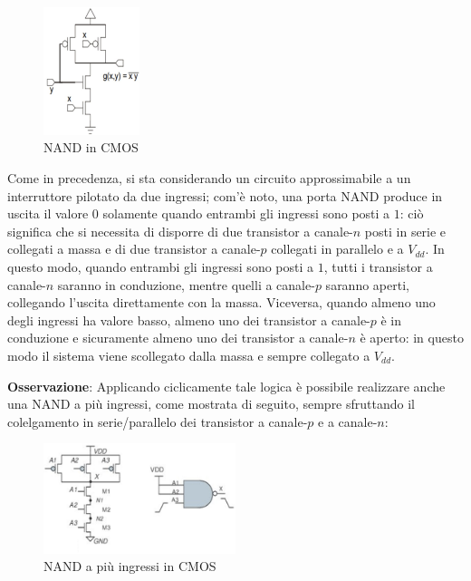 \documentclass[a4paper]{extarticle}
\begin{document}
\begin{figure}[H]
    \centering
    \includegraphics[width=0.25\textwidth]{nand-cmos.png}
    \caption{NAND in CMOS}
    \label{fig:nand_cmos}
\end{figure}

\vspace{1em}
\noindent
Come in precedenza, si sta considerando un circuito approssimabile a un interruttore pilotato da due ingressi; com'è noto, una porta NAND produce in uscita il valore $0$ solamente quando entrambi gli ingressi sono posti a $1$: ciò significa che si necessita di disporre di due transistor a canale-$n$ posti in serie e collegati a massa e di due transistor a canale-$p$ collegati in parallelo e a $V_{dd}$. In questo modo, quando entrambi gli ingressi sono posti a $1$, tutti i transistor a canale-$n$ saranno in conduzione, mentre quelli a canale-$p$ saranno aperti, collegando l'uscita direttamente con la massa. Viceversa, quando almeno uno degli ingressi ha valore basso, almeno uno dei transistor a canale-$p$ è in conduzione e sicuramente almeno uno dei transistor a canale-$n$ è aperto: in questo modo il sistema viene scollegato dalla massa e sempre collegato a $V_{dd}$.

\vspace{1em}
\noindent
\textbf{Osservazione}: Applicando ciclicamente tale logica è possibile realizzare anche una NAND a più ingressi, come mostrata di seguito, sempre sfruttando il colelgamento in serie/parallelo dei transistor a canale-$p$ e a canale-$n$:

\begin{figure}[H]
    \centering
    \includegraphics[width=0.5\textwidth]{nand-cmos-piu-ingressi.png}
    \caption{NAND a più ingressi in CMOS}
    \label{fig:nand_pi_ingressi_cmos}
\end{figure}
\end{document}
